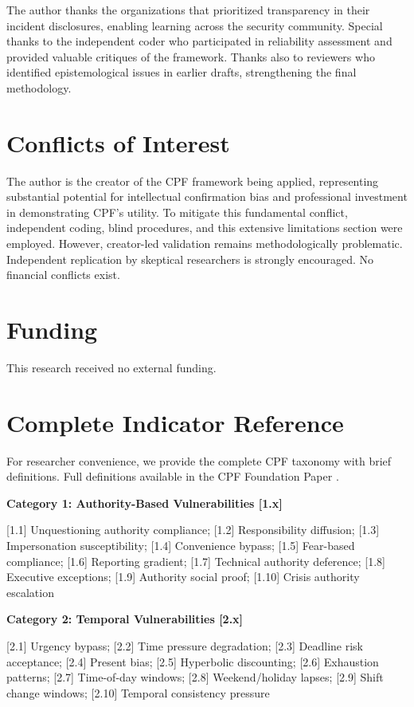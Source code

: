 \documentclass[11pt,a4paper]{article}
\begin{document}
The author thanks the organizations that prioritized transparency in their incident disclosures, enabling learning across the security community. Special thanks to the independent coder who participated in reliability assessment and provided valuable critiques of the framework. Thanks also to reviewers who identified epistemological issues in earlier drafts, strengthening the final methodology.

\section*{Conflicts of Interest}

The author is the creator of the CPF framework being applied, representing substantial potential for intellectual confirmation bias and professional investment in demonstrating CPF's utility. To mitigate this fundamental conflict, independent coding, blind procedures, and this extensive limitations section were employed. However, creator-led validation remains methodologically problematic. Independent replication by skeptical researchers is strongly encouraged. No financial conflicts exist.

\section*{Funding}

This research received no external funding.

\appendix

\section{Complete Indicator Reference}
\label{app:indicators}

For researcher convenience, we provide the complete CPF taxonomy with brief definitions. Full definitions available in the CPF Foundation Paper \cite{canale2025cpf}.

\textbf{Category 1: Authority-Based Vulnerabilities [1.x]}

[1.1] Unquestioning authority compliance; [1.2] Responsibility diffusion; [1.3] Impersonation susceptibility; [1.4] Convenience bypass; [1.5] Fear-based compliance; [1.6] Reporting gradient; [1.7] Technical authority deference; [1.8] Executive exceptions; [1.9] Authority social proof; [1.10] Crisis authority escalation

\textbf{Category 2: Temporal Vulnerabilities [2.x]}

[2.1] Urgency bypass; [2.2] Time pressure degradation; [2.3] Deadline risk acceptance; [2.4] Present bias; [2.5] Hyperbolic discounting; [2.6] Exhaustion patterns; [2.7] Time-of-day windows; [2.8] Weekend/holiday lapses; [2.9] Shift change windows; [2.10] Temporal consistency pressure
\end{document}
